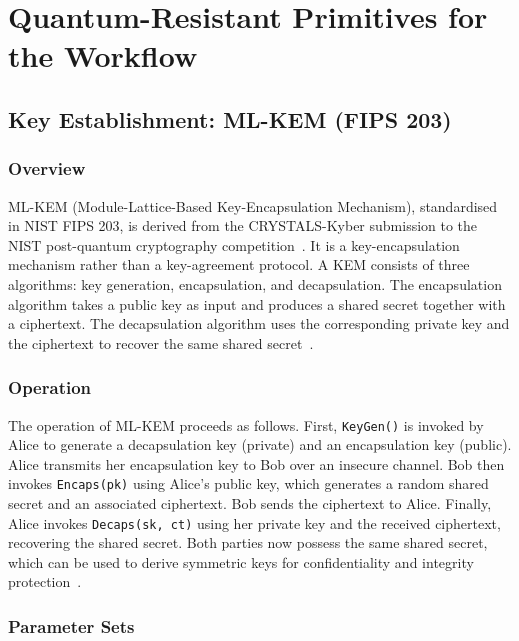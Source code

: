 \documentclass[12pt,a4paper]{article}
\begin{document}

\section{Quantum-Resistant Primitives for the Workflow}

\subsection{Key Establishment: ML-KEM (FIPS 203)}

\subsubsection{Overview}

ML-KEM (Module-Lattice-Based Key-Encapsulation Mechanism), standardised in NIST FIPS 203, is derived from the CRYSTALS-Kyber submission to the NIST post-quantum cryptography competition~\cite{nist-fips-203-2024}. It is a key-encapsulation mechanism rather than a key-agreement protocol. A KEM consists of three algorithms: key generation, encapsulation, and decapsulation. The encapsulation algorithm takes a public key as input and produces a shared secret together with a ciphertext. The decapsulation algorithm uses the corresponding private key and the ciphertext to recover the same shared secret~\cite{nist-fips-203-2024}.

\subsubsection{Operation}

The operation of ML-KEM proceeds as follows. First, \texttt{KeyGen()} is invoked by Alice to generate a decapsulation key (private) and an encapsulation key (public). Alice transmits her encapsulation key to Bob over an insecure channel. Bob then invokes \texttt{Encaps(pk)} using Alice's public key, which generates a random shared secret and an associated ciphertext. Bob sends the ciphertext to Alice. Finally, Alice invokes \texttt{Decaps(sk, ct)} using her private key and the received ciphertext, recovering the shared secret. Both parties now possess the same shared secret, which can be used to derive symmetric keys for confidentiality and integrity protection~\cite{nist-fips-203-2024}.

\subsubsection{Parameter Sets}
\end{document}

